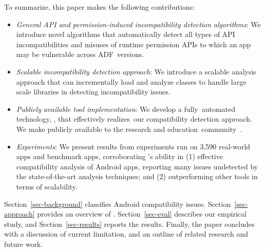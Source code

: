 To summarize,
this paper makes the following contributions:
 
 
\begin{itemize}
\item \textit{General API and permission-induced incompatibility detection algorithms}: We
introduce novel algorithms that automatically detect all types of API incompatibilities and misuses of runtime permission
APIs to which an app may be vulnerable across ADF~versions.


\item \textit{Scalable incompatibility detection approach}:
We introduce a scalable analysis approach that can incrementally
load and analyze classes to handle large scale libraries in 
detecting incompatibility issues. 

\item \textit{Publicly available tool implementation}: We develop a fully~automated
technology, \@approach, that effectively realizes~our
compatibility detection approach. We make \@approach publicly available to the research and education~community~\cite{GainDroid}.



\item \textit{Experiments}: We present results from
experiments run on 3,590 real-world apps and benchmark
apps, corroborating \@approach's ability in (1)
effective compatibility analysis of Android apps,
reporting many issues undetected by the
state-of-the-art analysis techniques; and (2)
outperforming other tools in terms of scalability.

\end{itemize}

Section~\ref{sec-background} classifies Android compatibility issues.  
Section~\ref{sec-approach} provides an overview of \@approach.
Section~\ref{sec-eval} describes our empirical study, and Section~\ref{sec-results} reports the results. 
Finally, the paper concludes with a discussion of %
current limitation, and an outline of related research and future work.
 
